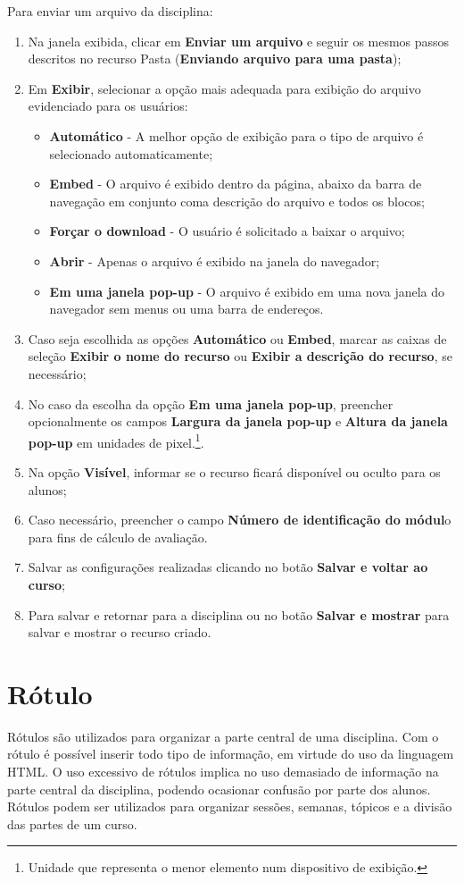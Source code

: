 Para enviar um arquivo da disciplina:
\begin{enumerate}
\item Na janela exibida, clicar em \textbf{Enviar um arquivo} e seguir os mesmos passos descritos no recurso Pasta (\textbf{Enviando arquivo para uma pasta});
\item Em \textbf{Exibir}, selecionar a opção mais adequada para exibição do arquivo evidenciado para os usuários:
\begin{itemize}
\item \textbf{Automático} - A melhor opção de exibição para o tipo de arquivo é selecionado automaticamente;
\item \textbf{Embed} - O arquivo é exibido dentro da página, abaixo da barra de navegação em conjunto coma descrição do arquivo e todos os blocos;
\item \textbf{Forçar o download} - O usuário é solicitado a baixar o arquivo;
\item \textbf{Abrir} - Apenas o arquivo é exibido na janela do navegador;
\item \textbf{Em uma janela pop-up} - O arquivo é exibido em uma nova janela do navegador sem menus ou uma barra de endereços.
\end{itemize}
\item Caso seja escolhida as opções \textbf{Automático} ou \textbf{Embed}, marcar as caixas de seleção \textbf{Exibir o nome do recurso} ou \textbf{Exibir a descrição do recurso}, se necessário;
\item No caso da escolha da opção \textbf{Em uma janela pop-up}, preencher opcionalmente os campos\textbf{ Largura da janela pop-up}  e \textbf{Altura da janela pop-up} em unidades de pixel.\footnote{Unidade que representa o menor elemento num dispositivo de exibição.}.
\item Na opção\textbf{ Visível}, informar se o recurso ficará disponível ou oculto para os alunos;
\item Caso necessário, preencher o campo \textbf{Número de identificação do módul}o para fins de cálculo de avaliação.
\item Salvar as configurações realizadas clicando no botão \textbf{Salvar e voltar ao curso};
\item Para salvar e retornar para a disciplina ou no botão  \textbf{Salvar e mostrar} para salvar e mostrar o recurso criado.
\end{enumerate}

\section{Rótulo}
Rótulos são utilizados para organizar a parte central de uma disciplina. Com o rótulo é possível inserir todo tipo de informação, em virtude do uso da linguagem HTML. O uso excessivo de rótulos implica no uso demasiado de informação na parte central da disciplina, podendo ocasionar confusão por parte dos alunos.
Rótulos podem ser utilizados para organizar sessões, semanas, tópicos e a divisão das partes de um curso.

